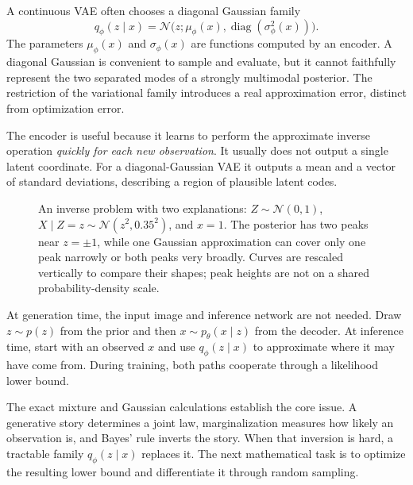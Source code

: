 A continuous VAE often chooses a diagonal Gaussian family
\[
 q_\phi(z\mid x)
 =\mathcal N\bigl(z;\mu_\phi(x),
           \operatorname{diag}(\sigma_\phi^2(x))\bigr).
\]
The parameters \(\mu_\phi(x)\) and \(\sigma_\phi(x)\) are functions computed by an encoder. A diagonal Gaussian is convenient to sample and evaluate, but it cannot faithfully represent the two separated modes of a strongly multimodal posterior. The restriction of the variational family introduces a real approximation error, distinct from optimization error.


The encoder is useful because it learns to perform the approximate inverse operation \emph{quickly for each new observation}. It usually does not output a single latent coordinate. For a diagonal-Gaussian VAE it outputs a mean and a vector of standard deviations, describing a region of plausible latent codes.

\begin{figure}[H]
\centering
{}
\caption{An inverse problem with two explanations: $Z\sim\mathcal N(0,1)$, $X\mid Z=z\sim\mathcal N(z^2,0.35^2)$, and $x=1$. The posterior has two peaks near $z=\pm1$, while one Gaussian approximation can cover only one peak narrowly or both peaks very broadly. Curves are rescaled vertically to compare their shapes; peak heights are not on a shared probability-density scale.}
\end{figure}

At generation time, the input image and inference network are not needed. Draw \(z\sim p(z)\) from the prior and then \(x\sim p_\theta(x\mid z)\) from the decoder. At inference time, start with an observed \(x\) and use \(q_\phi(z\mid x)\) to approximate where it may have come from. During training, both paths cooperate through a likelihood lower bound.

The exact mixture and Gaussian calculations establish the core issue. A generative story determines a joint law, marginalization measures how likely an observation is, and Bayes' rule inverts the story. When that inversion is hard, a tractable family \(q_\phi(z\mid x)\) replaces it. The next mathematical task is to optimize the resulting lower bound and differentiate it through random sampling.
